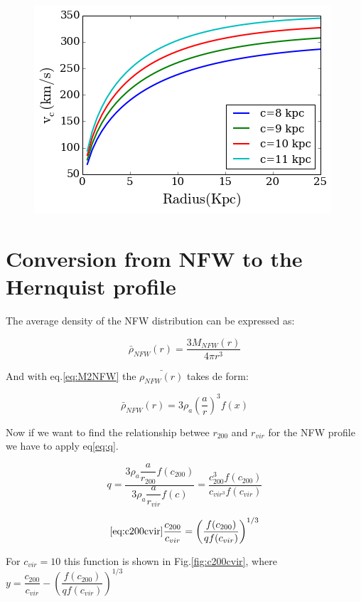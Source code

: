 \documentclass[a4paper, 12pt]{article} %
\begin{document}
\begin{figure}[H]
\centering
\includegraphics[scale=0.7]{NFW_vc.png}
\end{figure}



\section{Conversion from NFW to the Hernquist profile}

The average density of the NFW distribution can be expressed as:

\begin{equation}
\bar \rho_{NFW}(r) = \dfrac{3M_{NFW}(r)}{4 \pi r^3} 
\end{equation}

And with eq.\ref{eq:M2NFW} the $\bar{\rho_{NFW}(r)}$ takes de form:

\begin{equation}
\bar \rho_{NFW}(r) = 3 \rho_a \left( \dfrac{a}{r} \right)^{3}  f(x)
\end{equation}

Now if we want to find the relationship betwee $r_{200}$ and $r_{vir}$ 
for the NFW profile we have to apply eq\ref{eq:q}. 

\begin{equation}
q = \dfrac{3 \rho_a \dfrac{a}{r_{200}} f(c_{200})}{3 \rho_a \dfrac{a}{r_{vir}}f(c)} = \dfrac{c_{200}^{3}f(c_{200})}{c_{vir^3}f(c_{vir})}
\end{equation}


\begin{equation}\ref{eq:c200cvir}
\dfrac{c_{200}}{c_{vir}} = \left( \dfrac{f(c_{200})}{qf(c_{vir})} \right)^{1/3}
\end{equation}

For $c_{vir} = 10$ this function is shown in Fig.\ref{fig:c200cvir}, where 
$y = \dfrac{c_{200}}{c_{vir}} - \left( \dfrac{f(c_{200})}{qf(c_{vir})} \right)^{1/3}$
\end{document}
